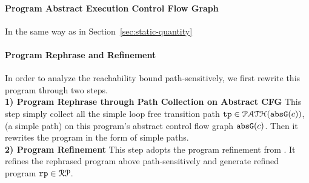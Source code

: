 \paragraph{Program Abstract Execution Control Flow Graph}
In the same way as in Section~\ref{sec:static-quantity}

\paragraph{Program Rephrase and Refinement}
In order to analyze the reachability bound path-sensitively, we first rewrite this program through two steps.
\\
\textbf{1) Program Rephrase through Path Collection on Abstract CFG}
This step simply collect all the simple loop free transition path
$\mathtt{tp} \in \mathcal{PATH}(\mathtt{abs}{\mathtt{G}}(c))$, (a simple path) on this program's abstract control flow graph $\mathtt{abs}{\mathtt{G}}(c)$.
Then it rewrites the program in the form of simple paths.
\\
\textbf{2) Program Refinement} This step adopts the program refinement from \cite{GulwaniJK09}.
It refines the rephrased program above path-sensitively and generate   refined program
$\mathtt{rp} \in \mathcal{RP}$.
